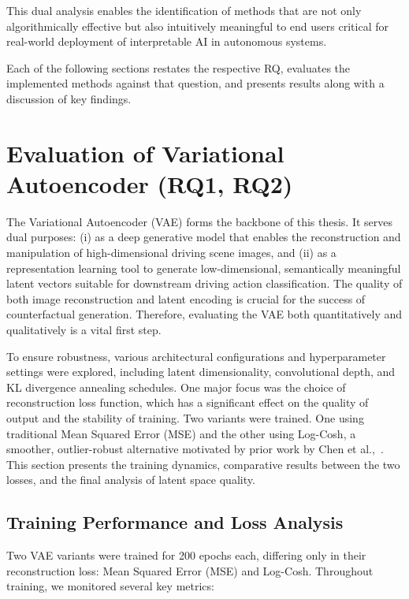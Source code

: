 This dual analysis enables the identification of methods that are not only algorithmically effective but also intuitively meaningful to end users critical for real-world deployment of interpretable AI in autonomous systems.
    


Each of the following sections restates the respective RQ, evaluates the implemented methods against that question, and presents results along with a discussion of key findings.


\section{Evaluation of Variational Autoencoder (RQ1, RQ2)} \label{sec:vae_evaluation}

The Variational Autoencoder (VAE) forms the backbone of this thesis. It serves dual purposes: (i) as a deep generative model that enables the reconstruction and manipulation of high-dimensional driving scene images, and (ii) as a representation learning tool to generate low-dimensional, semantically meaningful latent vectors suitable for downstream driving action classification. The quality of both image reconstruction and latent encoding is crucial for the success of counterfactual generation. Therefore, evaluating the VAE both quantitatively and qualitatively is a vital first step.

To ensure robustness, various architectural configurations and hyperparameter settings were explored, including latent dimensionality, convolutional depth, and KL divergence annealing schedules. One major focus was the choice of reconstruction loss function, which has a significant effect on the quality of output and the stability of training. Two variants were trained. One using traditional Mean Squared Error (MSE) and the other using Log-Cosh, a smoother, outlier-robust alternative motivated by prior work by Chen et al.,~\cite{chen2019log}. This section presents the training dynamics, comparative results between the two losses, and the final analysis of latent space quality.

\subsection{Training Performance and Loss Analysis} \label{subsubsec:vae_training_loss}

Two VAE variants were trained for 200 epochs each, differing only in their reconstruction loss: Mean Squared Error (MSE) and Log-Cosh. Throughout training, we monitored several key metrics:

